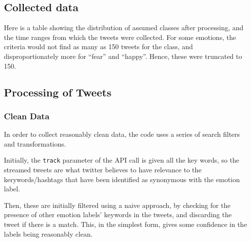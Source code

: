 \documentclass{mproj}
\begin{document}
\subsection{Collected data}


Here is a table showing the distribution of assumed classes after processing, and the time ranges from which the tweets were collected. For some emotions, the criteria would not find as many as 150 tweets for the class, and disproportionately more for ``fear'' and ``happy''. Hence, these were truncated to 150.

\begin{figure}[H]
\centering
{}

\end{figure}

\subsection{Processing of Tweets}

\subsubsection{Clean Data}

In order to collect reasonably clean data, the code uses a series of search filters and transformations.

Initially, the \lstinline{track} parameter of the API call is given all the key words, so the streamed tweets are what twitter believes to have relevance to the kerywords/hashtags that have been identified as synonymous with the emotion label.

Then, these are initially filtered using a naive approach, by checking for the presence of other emotion labels' keywords in the tweets, and discarding the tweet if there is a match. This, in the simplest form, gives some confidence in the labels being reasonably clean.
\end{document}
